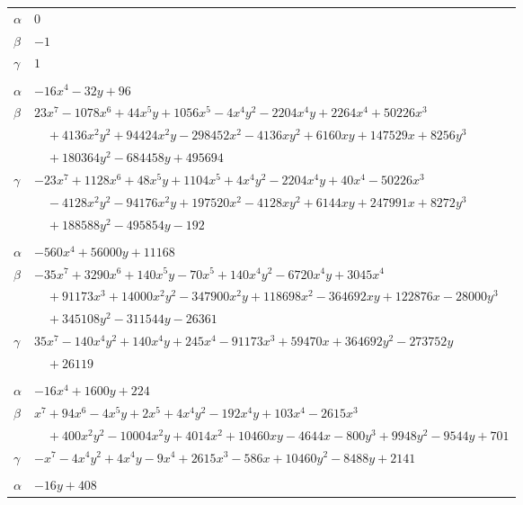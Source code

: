\documentclass[11pt]{article}
\begin{document}
\begin{longtable}{@{}ll@{}}
$\alpha$ & $0$\\
$\beta$ & $-1$\\
$\gamma$ & $1$\\
\addlinespace[3pt]
\multicolumn{2}{@{}l}{$\{i,j\}=\{83,101\}$, $k_{ij}=2^{5}\cdot 3\cdot 5$}\\
$\alpha$ & $-16x^{4}-32y+96$\\
$\beta$ & $23x^{7}-1078x^{6}+44x^{5}y+1056x^{5}-4x^{4}y^{2}-2204x^{4}y+2264x^{4}+50226x^{3}$\\
 & $\quad +4136x^{2}y^{2}+94424x^{2}y-298452x^{2}-4136xy^{2}+6160xy+147529x+8256y^{3}$\\
 & $\quad +180364y^{2}-684458y+495694$\\
$\gamma$ & $-23x^{7}+1128x^{6}+48x^{5}y+1104x^{5}+4x^{4}y^{2}-2204x^{4}y+40x^{4}-50226x^{3}$\\
 & $\quad -4128x^{2}y^{2}-94176x^{2}y+197520x^{2}-4128xy^{2}+6144xy+247991x+8272y^{3}$\\
 & $\quad +188588y^{2}-495854y-192$\\
\addlinespace[3pt]
\multicolumn{2}{@{}l}{$\{i,j\}=\{84,92\}$, $k_{ij}=2^{5}\cdot 3^{2}\cdot 13\cdot 17$}\\
$\alpha$ & $-560x^{4}+56000y+11168$\\
$\beta$ & $-35x^{7}+3290x^{6}+140x^{5}y-70x^{5}+140x^{4}y^{2}-6720x^{4}y+3045x^{4}$\\
 & $\quad +91173x^{3}+14000x^{2}y^{2}-347900x^{2}y+118698x^{2}-364692xy+122876x-28000y^{3}$\\
 & $\quad +345108y^{2}-311544y-26361$\\
$\gamma$ & $35x^{7}-140x^{4}y^{2}+140x^{4}y+245x^{4}-91173x^{3}+59470x+364692y^{2}-273752y$\\
 & $\quad +26119$\\
\addlinespace[3pt]
\multicolumn{2}{@{}l}{$\{i,j\}=\{84,98\}$, $k_{ij}=2^{7}\cdot 13$}\\
$\alpha$ & $-16x^{4}+1600y+224$\\
$\beta$ & $x^{7}+94x^{6}-4x^{5}y+2x^{5}+4x^{4}y^{2}-192x^{4}y+103x^{4}-2615x^{3}$\\
 & $\quad +400x^{2}y^{2}-10004x^{2}y+4014x^{2}+10460xy-4644x-800y^{3}+9948y^{2}-9544y+701$\\
$\gamma$ & $-x^{7}-4x^{4}y^{2}+4x^{4}y-9x^{4}+2615x^{3}-586x+10460y^{2}-8488y+2141$\\
\addlinespace[3pt]
\multicolumn{2}{@{}l}{$\{i,j\}=\{84,103\}$, $k_{ij}=2^{6}\cdot 3\cdot 17$}\\
$\alpha$ & $-16y+408$\\

\end{longtable}
\end{document}
